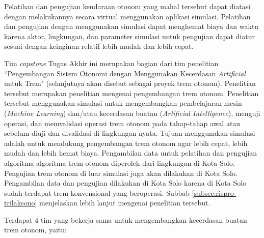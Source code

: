 Pelatihan dan pengujian kendaraan otonom yang mahal tersebut dapat diatasi
dengan melakukannya secara virtual menggunakan aplikasi simulasi. Pelatihan dan
pengujian dengan menggunakan simulasi dapat menghemat biaya dan waktu karena
aktor, lingkungan, dan parameter simulasi untuk pengujian dapat diatur sesuai
dengan keinginan relatif lebih mudah dan lebih cepat.

Tim \textit{capstone} Tugas Akhir ini merupakan bagian dari tim penelitian
``Pengembangan Sistem Otonomi dengan Menggunakan Kecerdasan \textit{Artificial}
untuk Trem" (selanjutnya akan disebut sebagai proyek trem otonom). Penelitian
tersebut merupakan penelitian mengenai pengembangan trem otonom. Penelitian
tersebut menggunakan simulasi untuk mengembangkan pembelajaran mesin
(\textit{Machine Learning}) dan/atau kecerdasan buatan (\textit{Artificial
Intelligence}), menguji operasi, dan memvalidasi operasi trem otonom pada
tahap-tahap awal atau sebelum diuji dan divalidasi di lingkungan nyata. Tujuan
menggunakan simulasi adalah untuk mendukung pengembangan trem otonom agar lebih
cepat, lebih mudah dan lebih hemat biaya. Pengambilan data untuk pelatihan dan
pengujian algoritma-algoritma trem otonom diperoleh dari lingkungan di Kota
Solo. Pengujian trem otonom di luar simulasi juga akan dilakukan di Kota Solo.
Pengambilan data dan pengujian dilakukan di Kota Solo karena di Kota Solo sudah
terdapat trem konvensional yang beroperasi. Subbab
\ref{subsec:rispro-trilaksono} menjelaskan lebih lanjut mengenai penelitian
tersebut.

Terdapat 4 tim yang bekerja sama untuk mengembangkan kecerdasan buatan trem
otonom, yaitu:


